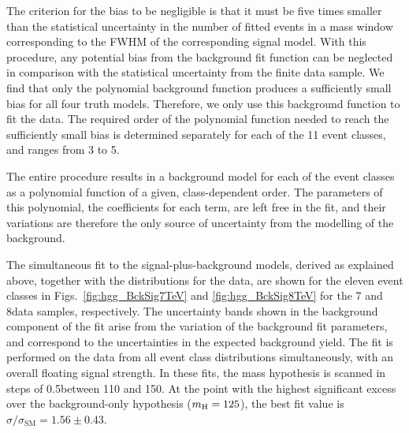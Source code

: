 \documentclass[12pt,twoside,a4paper,cmspaper,final,collab]{cms-tdr}
\begin{document}
The criterion for the bias to be negligible is that it must be
five times smaller than the statistical uncertainty in the number of fitted events
in a mass window corresponding to the FWHM of the corresponding signal model.
With this procedure, any potential bias from the background fit function can be neglected in comparison with the statistical
uncertainty from the finite data sample. We find that only the polynomial background function produces a
sufficiently small bias for all four truth models. Therefore, we only use this background function to fit the data.
The required order of the polynomial function needed to reach the sufficiently small bias is determined separately for each
of the 11 event classes, and ranges from 3 to 5.

The entire procedure results in a background model for each of the event classes as a polynomial function
of a given, class-dependent order. The parameters of this polynomial, \ie the coefficients for each term,
are left free in the fit, and their variations are therefore the only source of uncertainty
from the modelling of the background.

The simultaneous fit to the signal-plus-background models, derived as explained above,
together with the \mgg distributions for the data, are shown
for the eleven event classes in Figs.~\ref{fig:hgg_BckSig7TeV} and \ref{fig:hgg_BckSig8TeV}
for the 7 and  8\TeV data samples, respectively.
The uncertainty bands shown in the background component of the fit arise from the
variation of the background fit parameters, and correspond to the uncertainties
in the expected background yield.
The fit is performed on the data from all event class distributions simultaneously, with an overall floating signal strength.
In these fits, the mass hypothesis is scanned in steps of 0.5\GeV between 110 and 150\GeV. At the
point with the highest significant excess over the background-only hypothesis ($m_{\mathrm{H}}=125$\GeV),
the best fit value is $\sigma/\sigma_\mathrm{SM}=1.56\pm0.43$.
\end{document}
